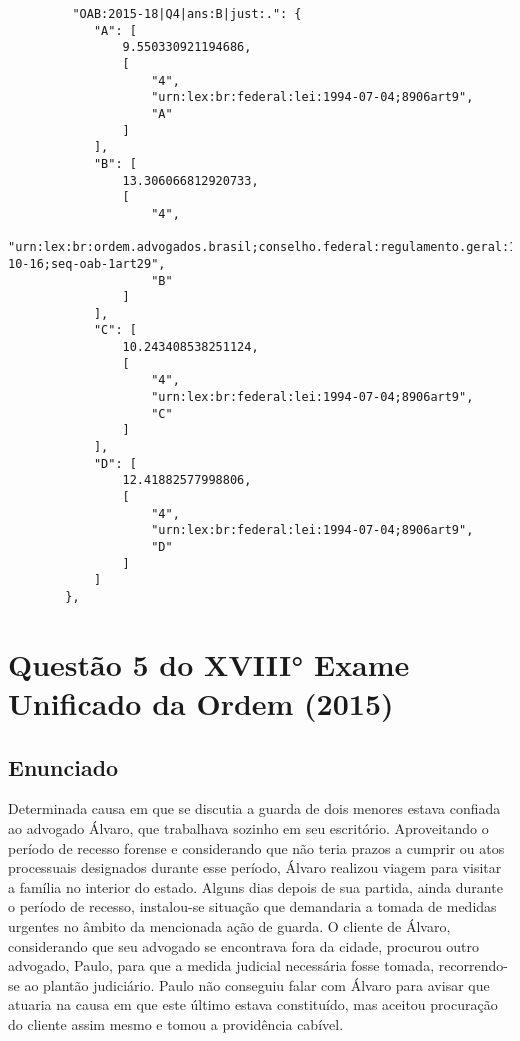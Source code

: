 \documentclass[12pt]{article}
\begin{document}
\begin{lstlisting}
         "OAB:2015-18|Q4|ans:B|just:.": {
            "A": [
                9.550330921194686,
                [
                    "4",
                    "urn:lex:br:federal:lei:1994-07-04;8906art9",
                    "A"
                ]
            ],
            "B": [
                13.306066812920733,
                [
                    "4",
                    "urn:lex:br:ordem.advogados.brasil;conselho.federal:regulamento.geral:1994-10-16;seq-oab-1art29",
                    "B"
                ]
            ],
            "C": [
                10.243408538251124,
                [
                    "4",
                    "urn:lex:br:federal:lei:1994-07-04;8906art9",
                    "C"
                ]
            ],
            "D": [
                12.41882577998806,
                [
                    "4",
                    "urn:lex:br:federal:lei:1994-07-04;8906art9",
                    "D"
                ]
            ]
        },

\end{lstlisting}

\section{Questão 5 do XVIII° Exame Unificado da Ordem (2015)}

\subsection{Enunciado}

Determinada causa em que se discutia a guarda de dois 
menores estava confiada ao advogado Álvaro, que trabalhava 
sozinho em seu escritório. Aproveitando o período de recesso 
forense e considerando que não teria prazos a cumprir ou atos 
processuais designados durante esse período, Álvaro realizou 
viagem para visitar a família no interior do estado. Alguns dias 
depois de sua partida, ainda durante o período de recesso, 
instalou-se situação que demandaria a tomada de medidas 
urgentes no âmbito da mencionada ação de guarda. O cliente 
de Álvaro, considerando que seu advogado se encontrava fora 
da cidade, procurou outro advogado, Paulo, para que a 
medida judicial necessária fosse tomada, recorrendo-se ao 
plantão judiciário. Paulo não conseguiu falar com Álvaro para 
avisar que atuaria na causa em que este último estava 
constituído, mas aceitou procuração do cliente assim mesmo e 
tomou a providência cabível. 
 
\end{document}
